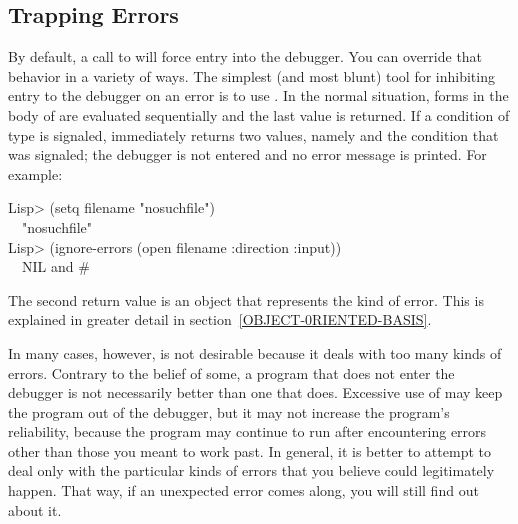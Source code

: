 \subsection{Trapping Errors}
\label{TRAPPING-ERRORS}

By default, a call to  will force entry into the debugger.  You can
override that behavior in a variety of ways. The simplest (and most blunt)
tool for inhibiting entry to the debugger on an error is to use .
In the normal situation, forms in the body of  are evaluated
sequentially and the last value is returned. If a condition of type  is
signaled,  immediately returns two values, namely  and the
condition that was signaled; the debugger is not entered and no error
message is printed. For example:
\begin{lisp}
Lisp> (setq filename "nosuchfile") \\
~\EV\ "nosuchfile" \\
Lisp> (ignore-errors (open filename :direction :input)) \\
~\EV\ NIL \textrm{and} \#<FILE-ERROR 3437523>
\end{lisp}
The second return value is an object that represents the kind of error. This
is explained in greater detail in section~\ref{OBJECT-0RIENTED-BASIS}.

In many cases, however,  is not desirable because it deals with
too many kinds of errors. Contrary to the belief of some, a program that
does not enter the debugger is not necessarily better than one that does.
Excessive use of  may keep the program out of the debugger, but it may
not increase the program's reliability, because the program may continue
to run after encountering errors other than those you meant to work past. In
general, it is better to attempt to deal only with the particular kinds of
errors that you believe could legitimately happen. That way, if an unexpected
error comes along, you will still find out about it.

